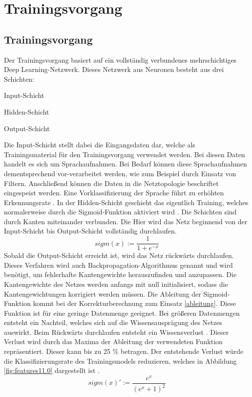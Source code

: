 \section{Trainingsvorgang}

\subsection{Trainingsvorgang}
Der Trainingsvorgang basiert auf ein vollständig verbundenes mehrschichtiges Deep Learning-Netzwerk. Dieses Netzwerk aus Neuronen besteht aus drei Schichten:
\begin{description}
	\item Input-Schicht
	\item Hidden-Schicht 
	\item Output-Schicht
\end{description}
Die Input-Schicht stellt dabei die Eingangsdaten dar, welche als Trainingsmaterial für den Trainingsvorgang verwendet werden. Bei diesen Daten handelt es sich um Sprachaufnahmen. Bei Bedarf können diese Sprachaufnahmen dementsprechend vor-verarbeitet werden, wie zum Beispiel durch Einsatz von Filtern. Anschließend können die Daten in die Netztopologie beschriftet eingespeist werden. Eine Vorklassifizierung der Sprache führt zu erhöhten Erkennungsrate \cite{bishop.2006}. In der Hidden-Schicht geschieht das eigentlich Training, welches normalerweise durch die Sigmoid-Funktion aktiviert wird \cite{bishop.2006}. Die Schichten sind durch Kanten miteinander verbunden. Die Hier wird das Netz beginnend von der Input-Schicht bis Output-Schicht vollständig durchlaufen.
\begin{equation*}
sigm(x) :=\frac{ 1 }{1+e^{-x}  }
\label{normal}
\end{equation*}
Sobald die Output-Schicht erreicht ist, wird das Netz rückwärts durchlaufen. Dieses Verfahren wird auch Backpropagation-Algorithmus genannt und wird benötigt, um fehlerhafte Kantengewichte herauszufinden und anzupassen. Die Kantengewichte des Netzes werden anfangs mit null initialisiert, sodass die Kantengewichtungen korrigiert werden müssen. Die Ableitung der Sigmoid-Funktion kommt bei der Korrekturberechnung zum Einsatz \ref{ableitung}. Diese Funktion ist für eine geringe Datenmenge geeignet. Bei größeren Datenmengen entsteht ein Nachteil, welches sich auf die Wissensausprägung des Netzes auswirkt. Beim Rückwärts durchlaufen entsteht ein Wissensverlust \cite{bishop.2006}. Dieser Verlust wird durch das Maxima der Ableitung der verwendeten Funktion repräsentiert. Dieser kann bis zu 25 \% betragen. Der entstehende Verlust würde die Klassifizierungsrate des Trainingsmodels reduzieren, welches in Abbildung \ref{fig:features11.0} dargestellt ist \cite{Kulbear.2017}.
\begin{equation*}
sigm(x)':= \frac{ e^{x} }{(e^{x} +1)^2  }
\label{ableitung}
\end{equation*}


